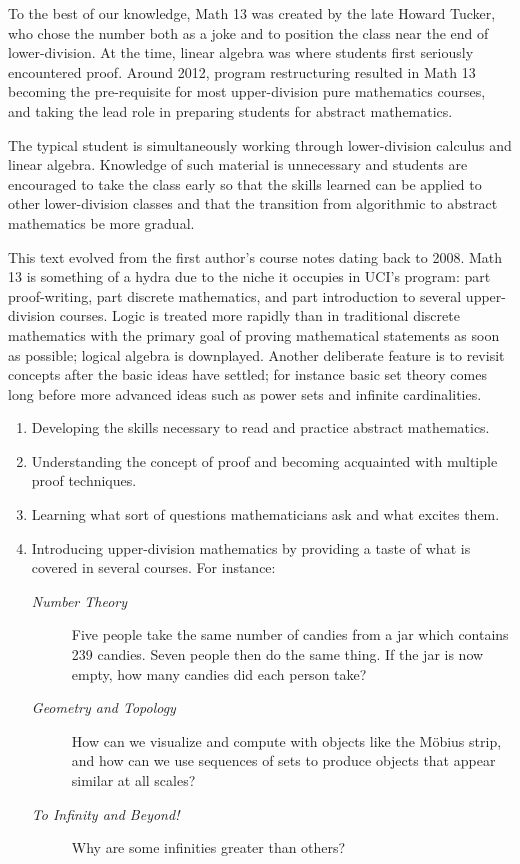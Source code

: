 To the best of our knowledge, Math 13 was created by the late Howard Tucker, who chose the number both as a joke and to position the class near the end of lower-division. At the time, linear algebra was where students first seriously encountered proof. Around 2012, program restructuring resulted in Math 13 becoming the pre-requisite for most upper-division pure mathematics courses, and taking the lead role in preparing students for abstract mathematics.\smallbreak

The typical student is simultaneously working through lower-division calculus and linear algebra. Knowledge of such material is unnecessary and students are encouraged to take the class early so  that the skills learned can be applied to other lower-division classes and that the transition from algorithmic to abstract mathematics be more gradual.\smallbreak

This text evolved from the first author's course notes dating back to 2008. Math 13 is something of a hydra due to the niche it occupies in UCI's program: part proof-writing, part discrete mathematics, and part introduction to several upper-division courses. Logic is treated more rapidly than in traditional discrete mathematics with the primary goal of proving mathematical statements as soon as possible; logical algebra is downplayed. Another deliberate feature is to revisit concepts after the basic ideas have settled; for instance basic set theory comes long before more advanced ideas such as power sets and infinite cardinalities. 



\begin{enumerate}%
	\item Developing the skills necessary to read and practice abstract mathematics.
	\item Understanding the concept of proof and becoming acquainted with multiple proof techniques.
	\item Learning what sort of questions mathematicians ask and what excites them.
	\item Introducing upper-division mathematics by providing a taste of what is covered in several courses. For instance:
	\begin{description}
		\item[\normalfont\emph{Number Theory}] Five people take the same number of candies from a jar which contains 239 candies. Seven people then do the same thing. If the jar is now empty, how many candies did each person take?
		\item[\normalfont\emph{Geometry and Topology}] How can we visualize and compute with objects like the Möbius strip, and how can we use sequences of sets to produce objects that appear similar at all scales?
		\item[\normalfont\emph{To Infinity and Beyond!}] Why are some infinities greater than others?
	\end{description}
\end{enumerate}


